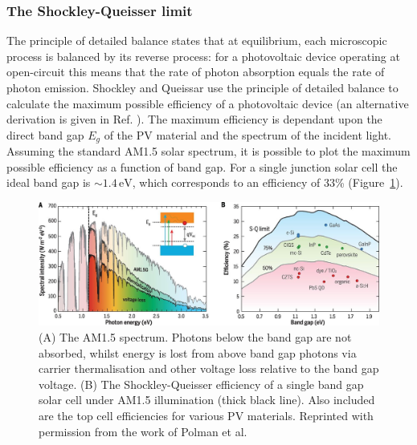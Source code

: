 

\subsubsection{The Shockley-Queisser limit}\label{sec:SQlimit}
The principle of detailed balance states that at equilibrium, each microscopic process is balanced by its reverse process: for a photovoltaic device operating at open-circuit this means that the rate of photon absorption equals the rate of photon emission. Shockley and Queissar use the principle of detailed balance to calculate the maximum possible efficiency of a photovoltaic device\autocite{Shockley1961} (an alternative derivation is given in Ref. \autocite{Nelson2003}). The maximum efficiency is dependant upon the direct band gap $E_g$ of the PV material and the spectrum of the incident light. Assuming the standard AM1.5 solar spectrum, it is possible to plot the maximum possible efficiency as a function of band gap. For a single junction solar cell the ideal band gap is $\sim 1.4\,\text{eV}$, which corresponds to an efficiency of 33\% (Figure\ \ref{SQlimit}). 

\begin{figure}[h]
\centering
   \includegraphics[width=1.0\columnwidth]{figures/ch1/SQlimit.jpg}
   \caption[AM1.5 spectral intensity and Shockley-Queisser efficiency]{(A) The AM1.5 spectrum. Photons below the band gap are not absorbed, whilst energy is lost from above band gap photons via carrier thermalisation and other voltage loss relative to the band gap voltage. (B) The Shockley-Queisser efficiency of a single band gap solar cell under AM1.5 illumination (thick black line). Also included are the top cell efficiencies for various PV materials. Reprinted with permission from the work of Polman et al.\autocite{Polman2016}}
   \label{SQlimit}
\end{figure}


